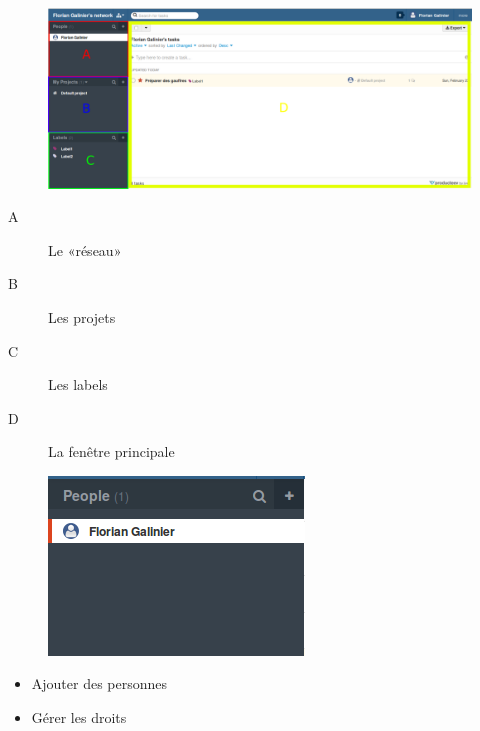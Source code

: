 \begin{frame}[Interface]
   \begin{figure}
    \includegraphics[scale=0.30]{img/interface.png}
  \end{figure}
  \begin{description}
    \item[A] Le «réseau»
    \item[B] Les projets
    \item[C] Les labels
    \item[D] La fenêtre principale
  \end{description}
\end{frame}

\begin{frame}[Le réseau]
   \begin{figure}
    \includegraphics[scale=0.90]{img/reseau.png}
  \end{figure}
  \begin{itemize}
    \item Ajouter des personnes
    \item Gérer les droits
  \end{itemize}
\end{frame}

